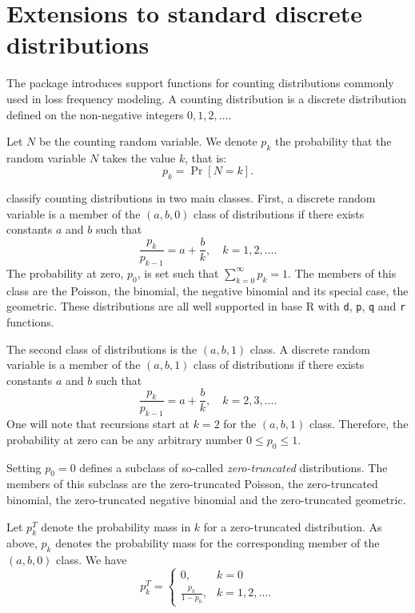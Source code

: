 \documentclass[x11names]{article}
\newcommand{\proglang}[1]{\textsf{#1}}
\newcommand{\code}[1]{\texttt{#1}}
\begin{document}
\section{Extensions to standard discrete distributions}
\label{sec:discrete}

The package introduces support functions for counting distributions
commonly used in loss frequency modeling. A counting distribution is a
discrete distribution defined on the non-negative integers
$0, 1, 2, \dots$.

Let $N$ be the counting random variable. We denote $p_k$ the
probability that the random variable $N$ takes the value $k$, that is:
\begin{equation*}
  p_k = \Pr[N = k].
\end{equation*}

\citet{LossModels4e} classify counting distributions in two main
classes. First, a discrete random variable is a member of the
$(a, b, 0)$ class of distributions if there exists constants $a$ and
$b$ such that
\begin{equation*}
  \frac{p_k}{p_{k - 1}} = a + \frac{b}{k}, \quad k = 1, 2, \dots.
\end{equation*}
The probability at zero, $p_0$, is set such that
$\sum_{k = 0}^\infty p_k = 1$. The members of this class are the
Poisson, the binomial, the negative binomial and its special case, the
geometric. These distributions are all well supported in base
\proglang{R} with \code{d}, \code{p}, \code{q} and \code{r} functions.

The second class of distributions is the $(a, b, 1)$ class. A discrete
random variable is a member of the $(a, b, 1)$ class of distributions
if there exists constants $a$ and $b$ such that
\begin{equation*}
  \frac{p_k}{p_{k - 1}} = a + \frac{b}{k}, \quad k = 2, 3, \dots.
\end{equation*}
One will note that recursions start at $k = 2$ for the $(a, b, 1)$
class. Therefore, the probability at zero can be any arbitrary number
$0 \leq p_0 \leq 1$.

Setting $p_0 = 0$ defines a subclass of so-called
\emph{zero-truncated} distributions. The members of this subclass are
the zero-truncated Poisson, the zero-truncated binomial, the
zero-truncated negative binomial and the zero-truncated geometric.

Let $p_k^T$ denote the probability mass in $k$ for a zero-truncated
distribution. As above, $p_k$ denotes the probability mass for the
corresponding member of the $(a, b, 0)$ class. We have
\begin{equation*}
  p_k^T =
  \begin{cases}
    0, & k = 0 \\
    \displaystyle\frac{p_k}{1 - p_0}, & k = 1, 2, \dots.
  \end{cases}
\end{equation*}
\end{document}
